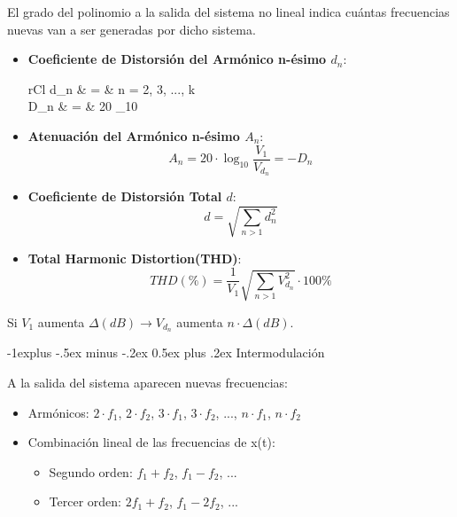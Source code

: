 \documentclass[10pt,portrait, twocolumn]{article}
\makeatletter
\renewcommand{\subsection}{\@startsection{subsection}{2}{0mm}%
                                {-1explus -.5ex minus -.2ex}%
                                {0.5ex plus .2ex}%
                                {\normalfont\normalsize\bfseries}}
\makeatother
\begin{document}
\begin{landscape}
\begin{multicols}{3}
El grado del polinomio a la salida del sistema no lineal indica cuántas frecuencias nuevas van a ser generadas por dicho sistema.

\begin{itemize}
	\item \textbf{Coeficiente de Distorsión del Armónico n-ésimo $d_n$}:
		\begin{IEEEeqnarray*}{rCl}
			d_n & = &  \hspace{5pt} n = 2, 3, ..., k \\
			D_n & = & 20 \cdot \log_{10} 	
		\end{IEEEeqnarray*}
	\item \textbf{Atenuación del Armónico n-ésimo $A_n$}:
		\begin{equation*}
			A_n = 20 \cdot \log_10 \frac{V_1}{V_{d_n}} = -D_n
		\end{equation*}
	\item \textbf{Coeficiente de Distorsión Total $d$}:
		\begin{equation*}
			d = \sqrt{\sum_{n>1} d_n^2}
		\end{equation*}
	\item \textbf{Total Harmonic Distortion(THD)}:
		\begin{equation*}
			THD(\%) = \frac{1}{V_1} \sqrt{\sum_{n>1} V_{d_n}^2} \cdot 100 \%
		\end{equation*}
\end{itemize}

Si $V_1$ aumenta $\Delta (dB) \rightarrow V_{d_n}$ aumenta $n \cdot \Delta (dB)$. 


\subsection{Intermodulación}

\begin{center}
\end{center}

A la salida del sistema aparecen nuevas frecuencias:

\begin{itemize}
	\item Armónicos: $2 \cdot f_1$, $2 \cdot f_2$, $3 \cdot f_1$, $3 \cdot f_2$, ..., $n \cdot f_1$, $n \cdot f_2$
	\item Combinación lineal de las frecuencias de x(t):
		\begin{itemize}
			\item Segundo orden: $f_1 + f_2$, $f_1 - f_2$, ...
			\item Tercer orden: $2 f_1 + f_2$, $f_1 - 2 f_2$, ... 
		\end{itemize} 
\end{itemize}


\end{multicols}
\end{landscape}
\end{document}
